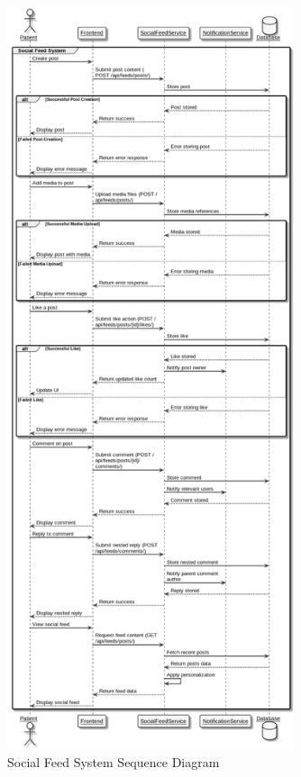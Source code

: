 \begin{figure}[H]
    \centering
    \includegraphics[width=0.75\textwidth]{Feeds_Sequence_Diagram.png}
    \caption{Social Feed System Sequence Diagram}
    \label{fig:feeds-sequence-diagram}
\end{figure}

